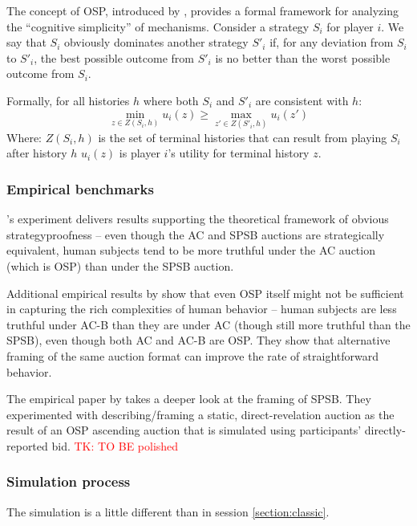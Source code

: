 \documentclass{article} %
\newcommand{\TK}[1]{\textcolor{red}{TK: #1}}
\begin{document}
 The concept of OSP, introduced by \cite{li2017obviously}, provides a formal framework for analyzing the ``cognitive simplicity'' of mechanisms.
Consider a strategy $S_i$ for player $i$. 
We say that $S_i$ obviously dominates another strategy $S'_i$ if, for any deviation from $S_i$ to $S'_i$, the best possible outcome from $S'_i$ is no better than the worst possible outcome from $S_i$.

Formally, for all histories $h$ where both $S_i$ and $S'_i$ are consistent with $h$:
\begin{equation}
\min_{z \in Z(S_i, h)} u_i(z) \geq \max_{z' \in Z(S'_i, h)} u_i(z')
\end{equation}
Where: $Z(S_i, h)$ is the set of terminal histories that can result from playing $S_i$ after history $h$
$u_i(z)$ is player $i$'s utility for terminal history $z$. 

\subsubsection{Empirical benchmarks}

\citet{li2017obviously}'s experiment delivers results supporting the theoretical framework of obvious strategyproofness -- even though the AC and SPSB auctions are strategically equivalent, human subjects tend to be more truthful under the AC auction (which is OSP) than under the SPSB auction. 

Additional empirical results by \citet{breitmoser2022obviousness} show that even OSP itself might not be sufficient in capturing the rich complexities of human behavior -- human subjects are less truthful under AC-B than they are under AC (though still more truthful than the SPSB), even though both AC and AC-B are OSP.  
They show that alternative framing of the same auction format can improve the rate of straightforward behavior.

 The empirical paper by \cite{gonczarowski2023strategyproofness} takes a
deeper look at the framing of SPSB. 
They experimented with describing/framing a static, direct-revelation auction as the result
of an OSP ascending auction that is simulated using participants’ directly-reported bid.
\TK{TO BE polished}

\subsubsection{Simulation process}

The simulation is a little different than in session \ref{section:classic}.
\end{document}
